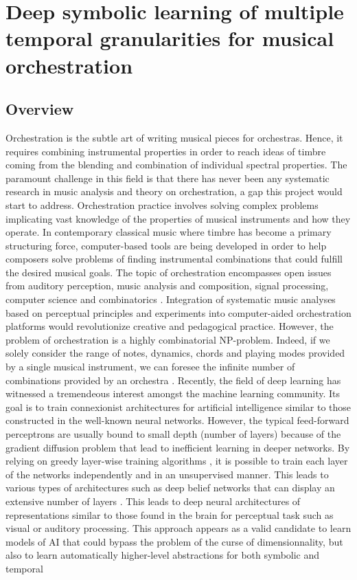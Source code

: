\documentclass[10pt]{article}
\begin{document}
\noindent\makebox[\linewidth]{\rule{\textwidth}{2pt}}
\section*{Deep symbolic learning of multiple temporal granularities for musical orchestration}
\noindent\makebox[\linewidth]{\rule{\textwidth}{2pt}} 
\subsection*{Overview}
\noindent\makebox[\linewidth]{\rule{\textwidth}{2pt}} 

Orchestration is the subtle art of writing musical pieces for orchestras. Hence, it requires combining instrumental properties in order to reach ideas of timbre coming from the blending and combination of individual spectral properties. The paramount challenge in this field is that there has never been any systematic research in music analysis and theory on orchestration, a gap this project would start to address. Orchestration practice involves solving complex problems implicating vast knowledge of the properties of musical instruments and how they operate. In contemporary classical music where timbre has become a primary structuring force, computer-based tools are being developed in order to help composers solve problems of finding instrumental combinations that could fulfill the desired musical goals. The topic of orchestration encompasses open issues from auditory perception, music analysis and composition, signal processing, computer science and combinatorics \cite{Esling}. Integration of systematic music analyses based on perceptual principles and experiments into computer-aided orchestration platforms would revolutionize creative and pedagogical practice. However, the problem of orchestration is a highly combinatorial NP-problem. Indeed, if we solely consider the range of notes, dynamics, chords and playing modes provided by a single musical instrument, we can foresee the infinite number of combinations provided by an orchestra \cite{esling2012multiobjective}. Recently, the field of deep learning \cite{bengio2009learning} has witnessed a tremendeous interest amongst the machine learning community. Its goal is to train connexionist architectures for artificial intelligence similar to those constructed in the well-known neural networks. However, the typical feed-forward perceptrons are usually bound to small depth (number of layers) because of the gradient diffusion problem that lead to inefficient learning in deeper networks. By relying on greedy layer-wise training algorithms \cite{bengio2007greedy}, it is possible to train each layer of the networks independently and in an unsupervised manner. This leads to various types of architectures such as deep belief networks that can display an extensive number of layers \cite{hinton2006fast}. This leads to deep neural architectures of representations similar to those found in the brain for perceptual task such as visual or auditory processing. This approach appears as a valid candidate to learn models of AI that could bypass the problem of the curse of dimensionnality, but also to learn automatically higher-level abstractions for both symbolic and temporal 
\end{document}
